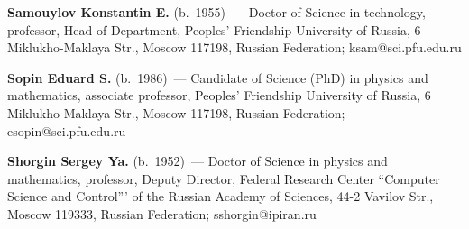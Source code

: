 \vspace*{3pt}

\noindent
\textbf{Samouylov Konstantin E.} (b.\ 1955)~---
Doctor of Science in technology, professor, Head of Department, Peoples' 
Friendship University of Russia, 6 Miklukho-Maklaya Str., Moscow 117198, 
Russian Federation; ksam@sci.pfu.edu.ru

\vspace*{3pt}

\noindent
\textbf{Sopin Eduard S.} (b.\ 1986)~---
Candidate of Science (PhD) in physics and mathematics, associate professor, 
Peoples' Friendship University of Russia, 6 Miklukho-Maklaya Str., Moscow 
117198, Russian Federation; esopin@sci.pfu.edu.ru

\vspace*{3pt}

\noindent
\textbf{Shorgin Sergey Ya.} (b.\ 1952)~---
Doctor of Science in physics and mathematics, professor, Deputy Director, Federal 
Research Center ``Computer Science and Control''' of the Russian Academy of 
Sciences, 44-2 Vavilov Str., Moscow 119333, Russian Federation; 
sshorgin@ipiran.ru

\label{end\stat}


\renewcommand{\bibname}{\protect\rm Литература}